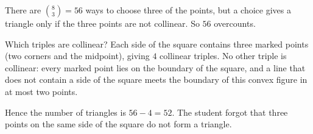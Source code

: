 There are $\binom83=56$ ways to choose three of the points, but a choice gives a triangle only if the three points are not collinear. So $56$ overcounts.

Which triples are collinear? Each side of the square contains three marked points (two corners and the midpoint), giving $4$ collinear triples. No other triple is collinear: every marked point lies on the boundary of the square, and a line that does not contain a side of the square meets the boundary of this convex figure in at most two points.

Hence the number of triangles is $56-4=\boxed{52}$. The student forgot that three points on the same side of the square do not form a triangle.
